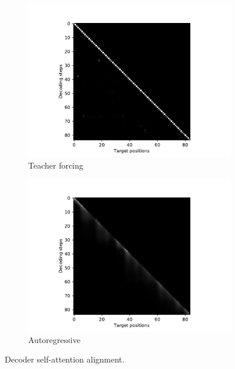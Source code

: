 \documentclass[11pt]{article}
\begin{document}
\begin{figure}
\begin{subfigure}{0.5\textwidth}
\centering
\includegraphics[width=\textwidth, trim={2cm 0 2cm 0}, clip]{image/attention_decoder_forcing.pdf}
\caption*{Teacher forcing}
\end{subfigure}%
\begin{subfigure}{0.5\textwidth}
\centering
\includegraphics[width=\textwidth, trim={2cm 0 2cm 0}, clip]{image/attention_decoder_autoreg.pdf}
\caption*{Autoregressive}
\end{subfigure}
\caption{\label{fig:att-decoder}Decoder self-attention alignment.}
\end{figure}
\end{document}
